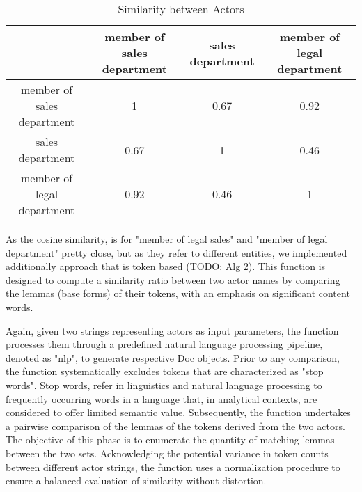 \begin{table}[h!]
\begin{center}
\caption{\centering Similarity between Actors}
\label{table:table1}
\begin{tabular}{c|c|c|c}
    & member of sales department & sales department & member of legal department\\ \hline
member of sales department 		  	&   1      &    0.67    &   0.92 \\
sales department	 				&   0.67   &    1       &   0.46  \\
member of legal department 			&   0.92   &    0.46    &   1 \\ \hline
\end{tabular}
\end{center}
\end{table}

As the cosine similarity, is for "member of legal sales" and "member of legal department" pretty close, but as they refer to different entities, we implemented additionally approach that is token based (TODO: Alg 2). This function is designed to compute a similarity ratio between two actor names by comparing the lemmas (base forms) of their tokens, with an emphasis on significant content words.

Again, given two strings representing actors as input parameters, the function processes them through a predefined natural language processing pipeline, denoted as "nlp", to generate respective Doc objects. Prior to any comparison, the function systematically excludes tokens that are characterized as "stop words". Stop words, refer in linguistics and natural language processing to frequently occurring words in a language that, in analytical contexts, are considered to offer limited semantic value. Subsequently, the function undertakes a pairwise comparison of the lemmas of the tokens derived from the two actors. The objective of this phase is to enumerate the quantity of matching lemmas between the two sets. Acknowledging the potential variance in token counts between different actor strings, the function uses a normalization procedure to ensure a balanced evaluation of similarity without distortion.

